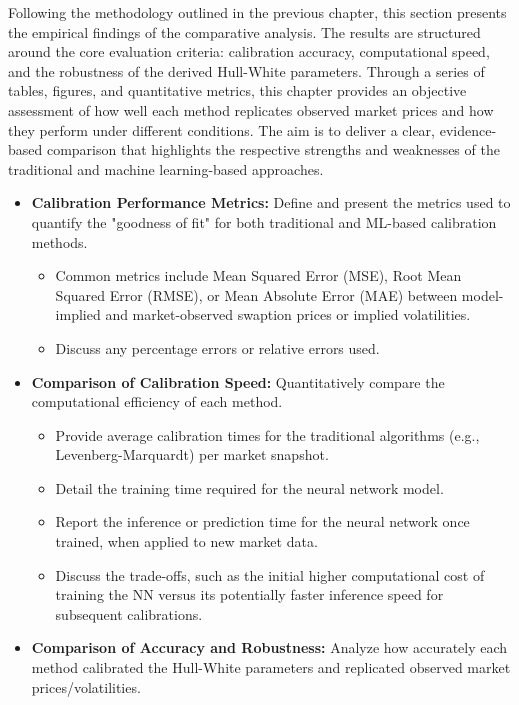 Following the methodology outlined in the previous chapter, this section presents the empirical findings of the comparative analysis. The results are structured around the core evaluation criteria: calibration accuracy, computational speed, and the robustness of the derived Hull-White parameters. Through a series of tables, figures, and quantitative metrics, this chapter provides an objective assessment of how well each method replicates observed market prices and how they perform under different conditions. The aim is to deliver a clear, evidence-based comparison that highlights the respective strengths and weaknesses of the traditional and machine learning-based approaches.

\begin{itemize}
    \item \textbf{Calibration Performance Metrics:} Define and present the metrics used to quantify the "goodness of fit" for both traditional and ML-based calibration methods.
    \begin{itemize}
        \item Common metrics include Mean Squared Error (MSE), Root Mean Squared Error (RMSE), or Mean Absolute Error (MAE) between model-implied and market-observed swaption prices or implied volatilities.
        \item Discuss any percentage errors or relative errors used.
    \end{itemize}
    \item \textbf{Comparison of Calibration Speed:} Quantitatively compare the computational efficiency of each method.
    \begin{itemize}
        \item Provide average calibration times for the traditional algorithms (e.g., Levenberg-Marquardt) per market snapshot.
        \item Detail the training time required for the neural network model.
        \item Report the inference or prediction time for the neural network once trained, when applied to new market data.
        \item Discuss the trade-offs, such as the initial higher computational cost of training the NN versus its potentially faster inference speed for subsequent calibrations.
    \end{itemize}
    \item \textbf{Comparison of Accuracy and Robustness:} Analyze how accurately each method calibrated the Hull-White parameters and replicated observed market prices/volatilities.

\end{itemize}
